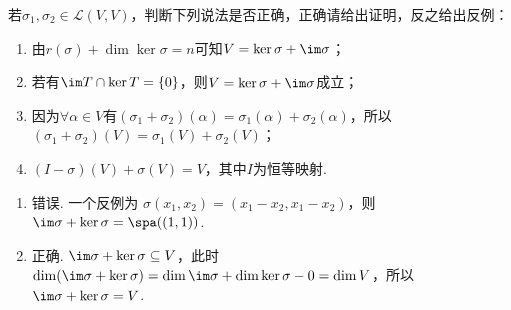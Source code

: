 \begin{exercise}
\begin{exgroup}
        \item 若$\sigma_1,\sigma_2\in \mathcal{L}(V,V)$，判断下列说法是否正确，正确请给出证明，反之给出反例：
        \begin{enumerate}
            \item 由$r(\sigma)+\dim\ker\sigma=n$可知$V=\ker\sigma+\im \sigma$；

            \item 若有$\im T \cap \ker T = \{0\}$，则$V=\ker\sigma+\im \sigma$成立；

            \item 因为$\forall \alpha \in V$有$(\sigma_1+\sigma_2)(\alpha)=\sigma_1(\alpha)+\sigma_2(\alpha)$，所以$(\sigma_1+\sigma_2)(V)=\sigma_1(V)+\sigma_2(V)$；

            \item $(I-\sigma)(V)+\sigma(V)=V$，其中$I$为恒等映射.
        \end{enumerate}

        \begin{answer}
            \begin{enumerate}
                \item 错误. 一个反例为 $ \sigma(x_1, x_2) = (x_1 - x_2, x_1 - x_2) $，则 $ \im \sigma + \ker \sigma = \spa((1, 1)) $.

                \item 正确. $ \im \sigma + \ker \sigma \subseteq V $，此时 $ \dim(\im \sigma + \ker \sigma) = \dim \im \sigma + \dim \ker \sigma - 0 = \dim V $，所以 $ \im \sigma + \ker \sigma = V $.


\end{enumerate}
\end{answer}
\end{exgroup}
\end{exercise}
